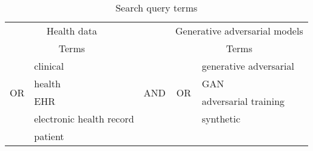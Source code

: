 \begin{table}[htb]
  \center
  \footnotesize
    \caption{Search query terms}\label{tab:search}
    \begin{tabular}{@{}clccl@{}} \toprule
	    \multicolumn{2}{c}{Health data} & & \multicolumn{2}{c}{Generative adversarial models} \\ \cmidrule{1-2} \cmidrule{4-5}
	    \multicolumn{2}{c}{Terms} & {} & \multicolumn{2}{c}{Terms} \\ \cmidrule{2-2} \cmidrule{5-5}
	    \multirow{4}{*}{OR} & clinical & \multirow[t]{4}{*}{\quad AND\quad} & \multirow{4}{*}{OR} & generative adversarial\\
	    {} & health & {} & {} & GAN \\ 
	    {} & EHR & {} & {} & adversarial training \\
	    {} & electronic health record & {} & {} & synthetic  \\
	    {} & patient & {} & {} & {} \\
	    \bottomrule
    \end{tabular}
\end{table}